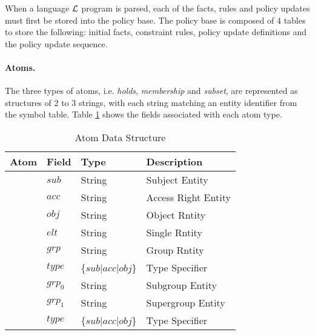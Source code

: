 \documentclass[11pt]{report}
\begin{document}
          When a language ${\cal L}$ program is parsed, each of the facts,
          rules and policy updates must first be stored into the policy base.
          The policy base is composed of 4 tables to store the following:
          initial facts, constraint rules, policy update definitions and
          the policy update sequence.

          \paragraph{Atoms.}

            The three types of atoms, i.e. {\em holds}, {\em membership}
            and {\em subset}, are represented as structures of 2 to 3
            strings, with each string matching an entity identifier from
            the symbol table. Table \ref{tabl-polup-atdsr} shows the
            fields associated with each atom type.

            \begin{table}[tbhp]
              \begin{center}
                \begin{tabular}[t]{|l|l|l|l|}
                  \hline
                  \textbf{Atom}             & \textbf{Field} & \textbf{Type}             & \textbf{Description} \\
                  \hline
                  {\multirow{3}{*}{holds}}  & $sub$          & String                    & Subject Entity \\
                  \cline{2-4}
                                            & $acc$          & String                    & Access Right Entity \\
                  \cline{2-4}
                                            & $obj$          & String                    & Object Rntity \\
                  \hline
                  {\multirow{3}{*}{member}} & $elt$          & String                    & Single Rntity \\
                  \cline{2-4}
                                            & $grp$          & String                    & Group Rntity \\
                  \cline{2-4}
                                            & $type$         & \{$sub$$|$$acc$$|$$obj$\} & Type Specifier \\
                  \hline
                  {\multirow{3}{*}{subset}} & $grp_0$        & String                    & Subgroup Entity \\
                  \cline{2-4}
                                            & $grp_1$        & String                    & Supergroup Entity \\
                  \cline{2-4}
                                            & $type$         & \{$sub$$|$$acc$$|$$obj$\} & Type Specifier \\
                  \hline
                \end{tabular}
              \end{center}
              \caption{Atom Data Structure}
              \label{tabl-polup-atdsr}
            \end{table}
\end{document}
